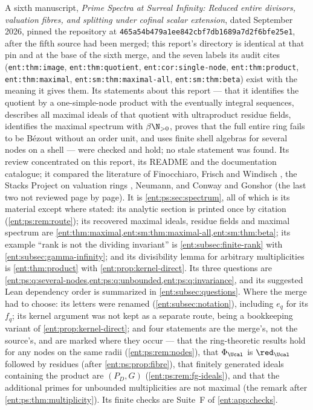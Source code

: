 \documentclass[11pt]{article}
\theoremstyle{plain}
\theoremstyle{plain}
\theoremstyle{plain}
\theoremstyle{definition}
\theoremstyle{definition}
\theoremstyle{definition}
\theoremstyle{definition}
\theoremstyle{remark}
\begin{document}
A sixth manuscript, \emph{Prime Spectra at Surreal Infinity: Reduced entire
divisors, valuation fibres, and splitting under cofinal scalar extension},
dated September 2026, pinned the repository at
\texttt{465a54b479a1ee842cbf\allowbreak 7db1689a7d2f6bfe25e1}, after the fifth
source had been merged; this report's directory is identical at that pin and
at the base of the sixth merge, and the seven labels its audit cites
(\texttt{ent:thm:image}, \texttt{ent:thm:quotient},
\texttt{ent:cor:single-node}, \texttt{ent:thm:product},
\texttt{ent:thm:maximal}, \texttt{ent:sm:thm:maximal-all},
\texttt{ent:sm:thm:beta}) exist with the meaning it gives them. Its
statements about this report --- that it identifies the quotient by a
one-simple-node product with the eventually integral sequences, describes
all maximal ideals of that quotient with ultraproduct residue fields,
identifies the maximal spectrum with $\beta\N_{>0}$, proves that the full
entire ring fails to be B\'ezout without an order unit, and uses finite shell
algebras for several nodes on a shell --- were checked and hold; no stale
statement was found. Its review concentrated on this report, its README and
the documentation catalogue; it compared the literature of Finocchiaro,
Frisch and Windisch \cite{FFW}, the Stacks Project on valuation rings
\cite{StacksValuation}, Neumann, and Conway and Gonshor (the last two not
reviewed page by page). It is \cref{ent:ps:sec:spectrum}, all of which is
its material except where stated: its analytic section is printed once by
citation (\cref{ent:ps:rem:route}); its recovered maximal ideals, residue
fields and maximal spectrum are
\cref{ent:thm:maximal,ent:sm:thm:maximal-all,ent:sm:thm:beta}; its example
``rank is not the dividing invariant'' is \cref{ent:subsec:finite-rank} with
\cref{ent:subsec:gamma-infinity}; and its divisibility lemma for arbitrary
multiplicities is \cref{ent:thm:product} with \cref{ent:prop:kernel-direct}.
Its three questions are \cref{ent:ps:q:several-nodes,ent:ps:q:unbounded,ent:ps:q:invariance},
and its suggested Lean dependency order is summarized in
\cref{ent:subsec:questions}. Where the merge had to choose: its letters were
renamed (\cref{ent:subsec:notation}), including $e_q$ for its $f_q$; its
kernel argument was not kept as a separate route, being a bookkeeping
variant of \cref{ent:prop:kernel-direct}; and four statements are the
merge's, not the source's, and are marked where they occur --- that the
ring-theoretic results hold for any nodes on the same radii
(\cref{ent:ps:rem:nodes}), that $\Phi_\Ucal$ is $\red_\Ucal$ followed by
residues (after \cref{ent:ps:prop:fibre}), that finitely generated ideals containing the
product are $(P_D,G)$ (\cref{ent:ps:rem:fg-ideals}), and that the additional
primes for unbounded multiplicities are not maximal (the remark after
\cref{ent:ps:thm:multiplicity}). Its finite checks are Suite~F of
\cref{ent:app:checks}.
\end{document}
